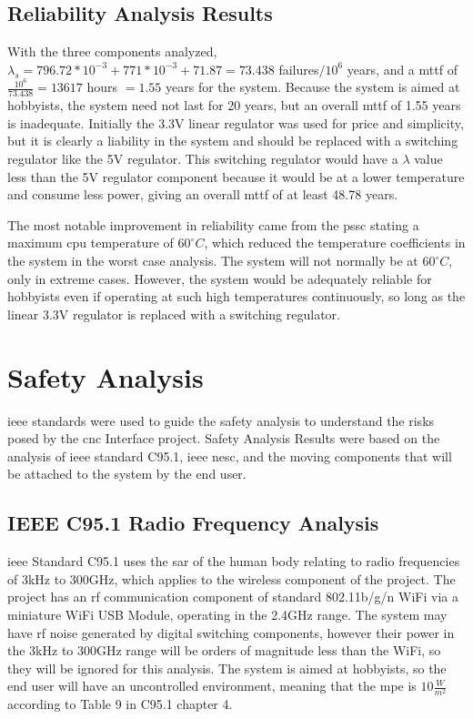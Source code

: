 \subsection{Reliability Analysis Results}
With the three components analyzed, $\lambda_s=796.72*10^{-3}+771*10^{-3}+71.87=73.438$ failures$/10^6$ years, and a \gls{mttf} of $\frac{10^6}{73.438}=13617$ hours $=1.55$ years for the system.
Because the system is aimed at hobbyists, the system need not last for 20 years, but an overall \gls{mttf} of 1.55 years is inadequate.
Initially the 3.3V linear regulator was used for price and simplicity, but it is clearly a liability in the system and should be replaced with a switching regulator like the 5V regulator.
This switching regulator would have a $\lambda$ value less than the 5V regulator component because it would be at a lower temperature and consume less power, giving an overall \gls{mttf} of at least 48.78 years.

The most notable improvement in reliability came from the \gls{pssc} stating a maximum \gls{cpu} temperature of $60^{\circ}C$, which reduced the temperature coefficients in the system in the worst case analysis.
The system will not normally be at $60^{\circ}C$, only in extreme cases.
However, the system would be adequately reliable for hobbyists even if operating at such high temperatures continuously, so long as the linear 3.3V regulator is replaced with a switching regulator.

\section{Safety Analysis}
\gls{ieee} standards were used to guide the safety analysis to understand the risks posed by the \gls{cnc} Interface project.
Safety Analysis Results were based on the analysis of \gls{ieee} standard C95.1\cite{ieeec951}, \gls{ieee} \gls{nesc}\cite{ieeenesc}, and the moving components that will be attached to the system by the end user. 

\subsection{IEEE C95.1 Radio Frequency Analysis}
\gls{ieee} Standard C95.1\cite{ieeec951} uses the \gls{sar} of the human body relating to radio frequencies of 3kHz to 300GHz, which applies to the wireless component of the project.
The project has an \gls{rf} communication component of standard 802.11b/g/n WiFi via a miniature WiFi USB Module, operating in the 2.4GHz range.
The system may have \gls{rf} noise generated by digital switching components, however their power in the 3kHz to 300GHz range will be orders of magnitude less than the WiFi, so they will be ignored for this analysis.
The system is aimed at hobbyists, so the end user will have an uncontrolled environment, meaning that the \gls{mpe} is $10\frac{W}{m^2}$ according to Table 9 in C95.1 chapter 4\cite{ieeec951}.

